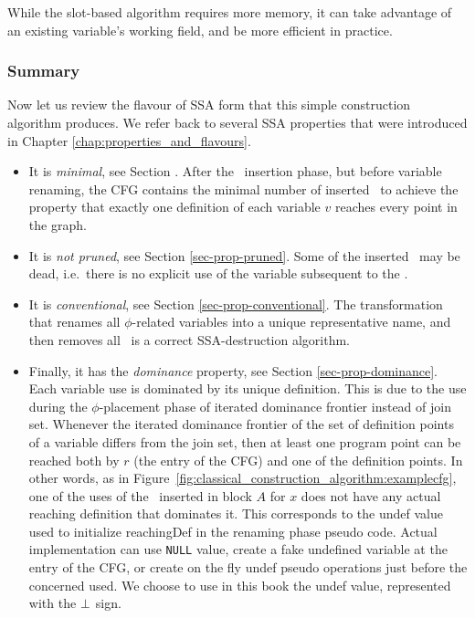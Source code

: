 While the slot-based algorithm requires more memory, it can take advantage of an existing variable's working field, and be more efficient in practice. 

\subsubsection*{Summary}

Now let us review the flavour of SSA form that this simple
construction algorithm produces. We refer back to several
SSA properties that were introduced in
Chapter \ref{chap:properties_and_flavours}.

\begin{itemize}
\item It is \textit{minimal}, see Section \label{sec:properties_and_flavors:minimality}.
After the \phiop\ insertion phase,
but before variable renaming, the CFG contains the minimal 
number of inserted \phiops\ to achieve the property that exactly
one definition of each variable $v$ reaches every point in the graph.
\item It is \textit{not pruned}, see Section \ref{sec-prop-pruned}.
Some of the inserted \phiops\
may be dead, i.e.\ there is no explicit use of the variable subsequent
to the \phiop.
\item It is \textit{conventional}, see Section \ref{sec-prop-conventional}.
The transformation that renames all $\phi$-related variables into a
unique representative name, and then removes all \phiops\ is a correct SSA-destruction algorithm.
\item Finally, it has the \textit{dominance} property, see Section
\ref{sec-prop-dominance}.
Each variable use is dominated by its unique definition. This is due to the use during the $\phi$-placement phase of iterated dominance frontier instead of join set. Whenever the iterated dominance frontier of the set of definition points of a variable differs from the join set, then at least one program point can be reached both by $r$ (the entry of the CFG) and one of the definition points. In other words, as in Figure~\ref{fig:classical_construction_algorithm:examplecfg}, one of the uses of the \phiop\ inserted in block $A$ for $x$ does not have any actual reaching definition that dominates it. This corresponds to the undef value used to initialize reachingDef in the renaming phase pseudo code. Actual implementation can use \texttt{NULL} value, create a fake undefined variable at the entry of the CFG, or create on the fly undef pseudo operations just before the concerned used. We choose to use in this book the undef value, represented with the $\perp$ sign.
\end{itemize}


